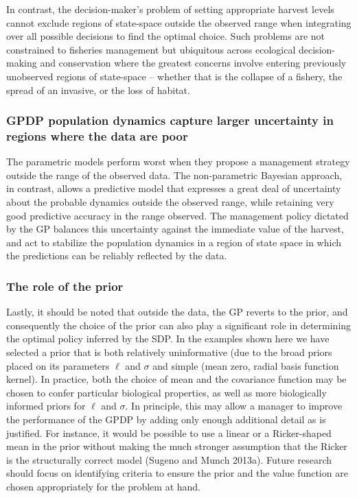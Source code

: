 \documentclass[author-year, 12pt,review]{components/elsarticle} %
\begin{document}
In contrast, the decision-maker's problem of setting appropriate harvest
levels cannot exclude regions of state-space outside the observed range
when integrating over all possible decisions to find the optimal choice.
Such problems are not constrained to fisheries management but ubiquitous
across ecological decision-making and conservation where the greatest
concerns involve entering previously unobserved regions of state-space
-- whether that is the collapse of a fishery, the spread of an invasive,
or the loss of habitat.

\subsubsection{GPDP population dynamics capture larger uncertainty in
regions where the data are
poor}\label{gpdp-population-dynamics-capture-larger-uncertainty-in-regions-where-the-data-are-poor}

The parametric models perform worst when they propose a management
strategy outside the range of the observed data. The non-parametric
Bayesian approach, in contrast, allows a predictive model that expresses
a great deal of uncertainty about the probable dynamics outside the
observed range, while retaining very good predictive accuracy in the
range observed. The management policy dictated by the GP balances this
uncertainty against the immediate value of the harvest, and act to
stabilize the population dynamics in a region of state space in which
the predictions can be reliably reflected by the data.

\subsubsection{The role of the prior}\label{the-role-of-the-prior}

Lastly, it should be noted that outside the data, the GP reverts to the
prior, and consequently the choice of the prior can also play a
significant role in determining the optimal policy inferred by the SDP.
In the examples shown here we have selected a prior that is both
relatively uninformative (due to the broad priors placed on its
parameters $\ell$ and $\sigma$ and simple (mean zero, radial basis
function kernel). In practice, both the choice of mean and the
covariance function may be chosen to confer particular biological
properties, as well as more biologically informed priors for $\ell$ and
$\sigma$. In principle, this may allow a manager to improve the
performance of the GPDP by adding only enough additional detail as is
justified. For instance, it would be possible to use a linear or a
Ricker-shaped mean in the prior without making the much stronger
assumption that the Ricker is the structurally correct model (Sugeno and
Munch 2013a). Future research should focus on identifying criteria to
ensure the prior and the value function are chosen appropriately for the
problem at hand.
\end{document}
